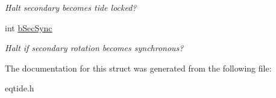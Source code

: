 \begin{DoxyCompactItemize}
\begin{DoxyCompactList}\small\item\em Halt secondary becomes tide locked? \end{DoxyCompactList}\item 
\hypertarget{struct_h_a_l_t_ad1513c16375381130ffa0a48d86e6a63}{}int \hyperlink{struct_h_a_l_t_ad1513c16375381130ffa0a48d86e6a63}{b\+Sec\+Sync}\label{struct_h_a_l_t_ad1513c16375381130ffa0a48d86e6a63}

\begin{DoxyCompactList}\small\item\em Halt if secondary rotation becomes synchronous? \end{DoxyCompactList}\end{DoxyCompactItemize}


The documentation for this struct was generated from the following file\+:\begin{DoxyCompactItemize}
\item 
eqtide.\+h\end{DoxyCompactItemize}
